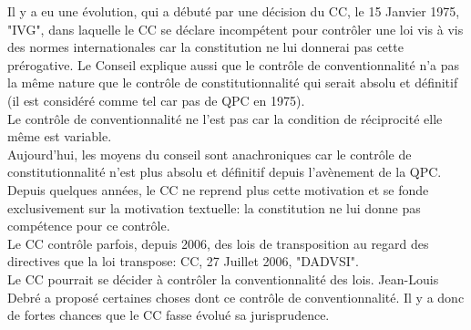 \documentclass[10pt, a4paper, openany]{book}
\begin{document}
Il y a eu une évolution, qui a débuté par une décision du CC, le 15 Janvier 1975, "IVG", dans laquelle le CC se déclare incompétent pour contrôler une loi vis à vis des normes internationales car la constitution ne lui donnerai pas cette prérogative. Le Conseil explique aussi que le contrôle de conventionnalité n'a pas la même nature que le contrôle de constitutionnalité qui serait absolu et définitif (il est considéré comme tel car pas de QPC en 1975). \\
Le contrôle de conventionnalité ne l'est pas car la condition de réciprocité elle même est variable. \\
Aujourd'hui, les moyens du conseil sont anachroniques car le contrôle de constitutionnalité n'est plus absolu et définitif depuis l'avènement de la QPC. Depuis quelques années, le CC ne reprend plus cette motivation et se fonde exclusivement sur la motivation textuelle: la constitution ne lui donne pas compétence pour ce contrôle. \\
Le CC contrôle parfois, depuis 2006, des lois de transposition au regard des directives que la loi transpose: CC, 27 Juillet 2006, "DADVSI". \\
Le CC pourrait se décider à contrôler la conventionnalité des lois. Jean-Louis Debré a proposé certaines choses dont ce contrôle de conventionnalité. Il y a donc de fortes chances que le CC fasse évolué sa jurisprudence. 
\end{document}
